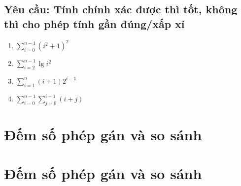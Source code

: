\documentclass[12pt, letterpaper]{article}
\begin{document}
  \subsection{Yêu cầu: Tính chính xác được thì tốt, không thì cho phép tính gần đúng/xấp xỉ}
  \begin{enumerate}
    \item $ \sum^{n - 1}_{i = 0} {(i^2 + 1)}^2 $
    \item $ \sum^{n - 1}_{i = 2} \lg i^2 $
    \item $ \sum^{n}_{i = 1} (i + 1)2^{i - 1} $
    \item $ \sum^{n - 1}_{i = 0} \sum^{i - 1}_{j = 0} (i + j) $
  \end{enumerate}

  \section{Đếm số phép gán và so sánh}
  \section{Đếm số phép gán và so sánh}
\end{document}
